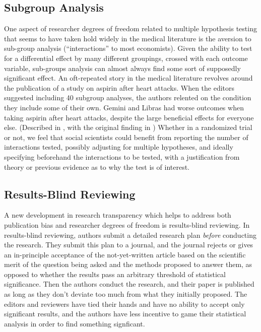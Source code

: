 \documentclass[12pt] {article}
\begin{document}
\subsection{Subgroup Analysis}
One aspect of researcher degrees of freedom related to multiple hypothesis testing that seems to have taken hold widely in the medical literature is the aversion to sub-group analysis (``interactions'' to
most economists). Given the ability to test for a differential effect by many different groupings, crossed with each outcome variable, sub-groups analysis can almost always find some sort of supposedly significant effect. An oft-repeated story in the medical literature revolves around the publication
of a study on aspirin after heart attacks. When the editors suggested including 40 subgroup analyses, the authors relented on the condition
they include some of their own. Gemini and Libras had worse outcomes
when taking aspirin after heart attacks, despite the large beneficial
effects for everyone else. (Described in \cite{schulz_multiplicity_2005},
with the original finding in \cite{isis-2_second_international_study_of_infarct_survival_collaborative_group_randomised_1988}) Whether in a randomized trial or
not, we feel that social scientists could benefit from reporting the number of
interactions tested, possibly adjusting for multiple hypotheses, and
ideally specifying beforehand the interactions to be tested, with a justification from theory or previous evidence as to why the test is of interest. 


\subsection{Results-Blind Reviewing}
A new development in research transparency which helps to address both publication bias and researcher degrees of freedom is results-blind reviewing. In results-blind reviewing, authors submit a detailed research plan \textit{before} conducting the research. They submit this plan to a journal, and the journal rejects or gives an in-principle acceptance of the not-yet-written article based on the scientific merit of the question being asked and the methods proposed to answer them, as opposed to whether the results pass an arbitrary threshold of statistical significance. Then the authors conduct the research, and their paper is published as long as they don't deviate too much from what they initially proposed. The editors and reviewers have tied their hands and have no ability to accept only significant results, and the authors have less incentive to game their statistical analysis in order to find something signficant. 
\end{document}
